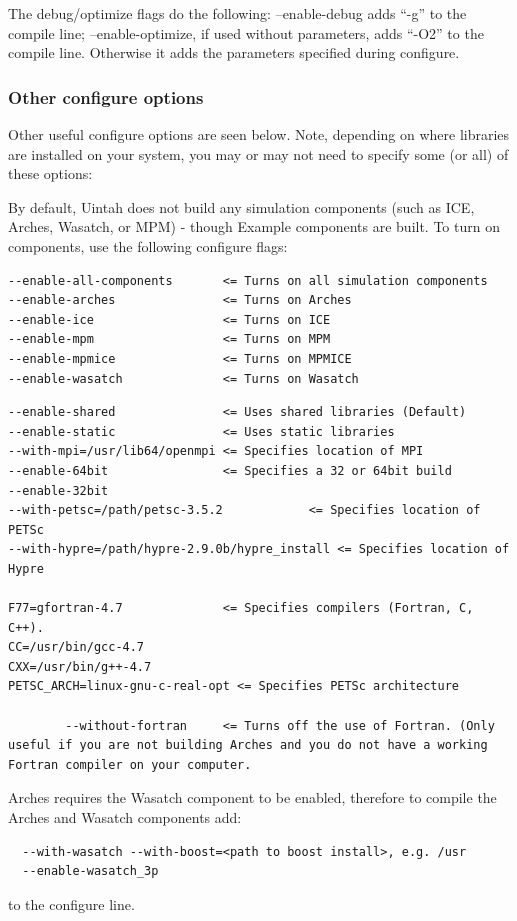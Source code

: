 \documentclass[12pt]{article}
\begin{document}
The debug/optimize flags do the following:  --enable-debug adds ``-g''
to the compile line; --enable-optimize, if used without parameters,
adds ``-O2'' to the compile line.  Otherwise it adds the parameters
specified during configure.

\subsubsection{Other configure options}

Other useful configure options are seen below.  Note, depending on
where libraries are installed on your system, you may or may not need
to specify some (or all) of these options:

By default, Uintah does not build any simulation components (such as
ICE, Arches, Wasatch, or MPM) - though Example components are built.
To turn on components, use the following configure flags:

\begin{verbatim}
--enable-all-components       <= Turns on all simulation components
--enable-arches               <= Turns on Arches
--enable-ice                  <= Turns on ICE
--enable-mpm                  <= Turns on MPM
--enable-mpmice               <= Turns on MPMICE
--enable-wasatch              <= Turns on Wasatch
\end{verbatim}

\begin{verbatim}
--enable-shared               <= Uses shared libraries (Default)
--enable-static               <= Uses static libraries 
--with-mpi=/usr/lib64/openmpi <= Specifies location of MPI
--enable-64bit                <= Specifies a 32 or 64bit build
--enable-32bit
--with-petsc=/path/petsc-3.5.2            <= Specifies location of PETSc
--with-hypre=/path/hypre-2.9.0b/hypre_install <= Specifies location of Hypre

F77=gfortran-4.7              <= Specifies compilers (Fortran, C, C++).
CC=/usr/bin/gcc-4.7
CXX=/usr/bin/g++-4.7
PETSC_ARCH=linux-gnu-c-real-opt <= Specifies PETSc architecture

        --without-fortran     <= Turns off the use of Fortran. (Only
useful if you are not building Arches and you do not have a working
Fortran compiler on your computer. 

\end{verbatim}

Arches requires the Wasatch component to be enabled, therefore to
compile the Arches and Wasatch components add:
\begin{verbatim}
  --with-wasatch --with-boost=<path to boost install>, e.g. /usr
  --enable-wasatch_3p
\end{verbatim}
to the configure line.
\end{document}
